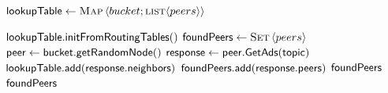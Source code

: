 \begin{algorithm}[]%
    \caption{%
        Lookup algorithm run by searchers.
    }%
    \label{alg:lookup}%
    \begin{algorithmic}[1]%
         \footnotesize
        \State $\mathsf{lookupTable} \gets  \textsc{Map}\left \langle bucket;\textsc{list}\langle peers \rangle \right \rangle$
        \item[]
            \State $\mathsf{lookupTable.initFromRoutingTables()}$
            \State $\mathsf{foundPeers} \gets  \textsc{Set}\left \langle peers\right \rangle$
                    \State $\mathsf{peer} \gets \mathsf{bucket.getRandomNode()}$
                    \State $\mathsf{response} \gets \mathsf{peer.GetAds(topic)}$
                    \State $\mathsf{lookupTable.add}(\mathsf{response.neighbors})$
                    \State $\mathsf{foundPeers.add}(\mathsf{response.peers})$
                        \State \Return $\mathsf{foundPeers}$
                    \EndIf
                \EndFor
            \EndFor
            \State \Return $\mathsf{foundPeers}$
        \EndProcedure
    \end{algorithmic}%
\end{algorithm}%

